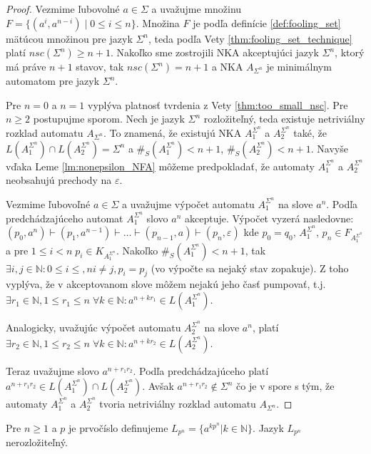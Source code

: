 \begin{proof}
Vezmime ľubovolné $ a \in \Sigma $ a uvažujme množinu $ F = \lbrace (a^i,a^{n-i}) \; | \; 0 \leq i \leq n \rbrace $. Množina $ F $ je podľa definície \ref{def:fooling_set} mätúcou množinou pre jazyk $ \Sigma^n $, teda podľa Vety \ref{thm:fooling_set_technique} platí $ nsc(\Sigma^n) \geq n+1 $. Nakoľko sme zostrojili NKA akceptujúci jazyk $ \Sigma^n $, ktorý má práve $ n+1 $ stavov, tak $ nsc(\Sigma^n) = n+1 $ a NKA $ A_{\Sigma^n} $ je minimálnym automatom pre jazyk $ \Sigma^n $.
\par
Pre $ n=0 $ a $ n=1 $ vyplýva platnosť tvrdenia z Vety \ref{thm:too_small_nsc}. Pre $ n \geq 2 $ postupujme sporom. Nech je jazyk $ \Sigma^n$ rozložiteľný, teda existuje netriviálny rozklad automatu $ A_{\Sigma^n} $. To znamená, že existujú NKA $ A_1^{\Sigma^n} $ a $ A_2^{\Sigma^n} $ také, že $ L(A_1^{\Sigma^n}) \cap L(A_2^{\Sigma^n}) = \Sigma^n $ a $ \#_S(A_1^{\Sigma^n}) < n+1 $, $ \#_S(A_2^{\Sigma^n}) < n+1 $. Navyše vďaka Leme \ref{lm:nonepsilon_NFA} môžeme predpokladať, že automaty $ A_1^{\Sigma^n} $ a $ A_2^{\Sigma^n} $ neobsahujú prechody na $ \varepsilon $. 
\par
Vezmime ľubovoľné $ a \in \Sigma $ a uvažujme výpočet automatu $ A_1^{\Sigma^n} $ na slove $ a^n $. Podľa predchádzajúceho automat $ A_1^{\Sigma^n} $ slovo $ a^n $ akceptuje. Výpočet vyzerá nasledovne: $ (p_0,a^n) \vdash (p_1, a^{n-1}) \vdash \ldots \vdash (p_{n-1}, a) \vdash (p_n, \varepsilon) $ kde $ p_0 = q_0$, $ A_1^{\Sigma^n} $, $ p_n \in F_{A_1^{\Sigma^n}} $ a pre $ 1 \leq i < n \; p_i \in K_{A_1^{\Sigma^n}}$. Nakoľko $ \#_S(A_1^{\Sigma^n}) < n+1 $, tak $ \exists i,j \in \mathbb{N}: 0 \leq i \leq, n i \neq j, p_i=p_j $ (vo výpočte sa nejaký stav zopakuje). Z toho vyplýva, že v akceptovanom slove môžem nejakú jeho časť pumpovať, t.j. $ \exists r_1 \in \mathbb{N}, 1 \leq r_1 \leq n \; \forall k \in \mathbb{N}: a^{n + kr_1} \in L(A_1^{\Sigma^n}) $.
\par
Analogicky, uvažujúc výpočet automatu $ A_2^{\Sigma^n} $ na slove $ a^n $, platí $ \exists r_2 \in \mathbb{N}, 1 \leq r_2 \leq n \; \forall k \in \mathbb{N}: a^{n + kr_2} \in L(A_2^{\Sigma^n}) $.
\par
Teraz uvažujme slovo $ a^{n+r_1r_2} $. Podľa predchádzajúceho platí $ a^{n+r_1r_2} \in L(A_1^{\Sigma^n}) \cap L(A_2^{\Sigma^n}) $. Avšak $ a^{n+r_1r_2} \notin \Sigma^n $ čo je v spore s tým, že automaty $ A_1^{\Sigma^n} $ a $ A_2^{\Sigma^n} $ tvoria netriviálny rozklad automatu $ A_{\Sigma^n} $.
\end{proof}

\begin{theorem}
\label{thm:prime^n}
Pre $ n \geq 1 $ a $ p $ je prvočíslo definujeme $ L_{p^n} = \lbrace a^{kp^{n}} | k \in \mathbb{N} \rbrace $. Jazyk $ L_{p^n} $ nerozložiteľný.
\end{theorem}

